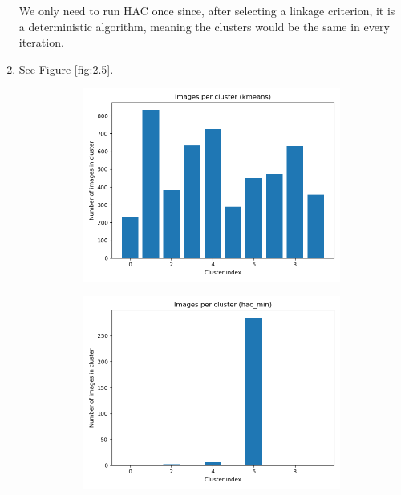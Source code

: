 \documentclass[submit]{harvardml}
\begin{document}
\begin{enumerate}
	We only need to run HAC once since, after selecting a linkage criterion, it is a deterministic algorithm, meaning the clusters would be the same in every iteration.

	\item See Figure \ref{fig:2.5}.
	
	\begin{figure}[h]
		\centering
		\begin{subfigure}[b]{0.475\textwidth}
			\includegraphics[width=\textwidth]{kmeans_nimages_per_cluster}
		\end{subfigure}
		\hfill
		\begin{subfigure}[b]{0.475\textwidth}
			\includegraphics[width=\textwidth]{hac_min_nimages_per_cluster}

\end{subfigure}
\end{figure}
\end{enumerate}
\end{document}
